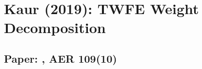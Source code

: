 \documentclass[12pt]{article}
\begin{document}
\section*{Kaur (2019): TWFE Weight Decomposition}
\subsection*{Paper: , AER 109(10)}




\end{document}
